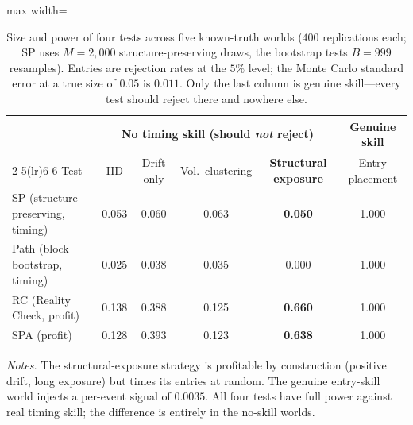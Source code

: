 \begin{table}[H]
\centering
\caption{Size and power of four tests across five known-truth worlds ($400$ replications each; SP uses $M=2{,}000$ structure-preserving draws, the bootstrap tests $B=999$ resamples). Entries are rejection rates at the $5\%$ level; the Monte Carlo standard error at a true size of $0.05$ is $0.011$. Only the last column is genuine skill---every test should reject there and nowhere else.}
\label{tab:competitor}
{\small
\renewcommand{\arraystretch}{1.15}
\begin{adjustbox}{max width=\textwidth}
\begin{tabular}{@{}lccccc@{}}
\toprule
& \multicolumn{4}{c}{No timing skill (should \emph{not} reject)} & Genuine skill \\
\cmidrule(lr){2-5}\cmidrule(lr){6-6}
Test & IID & Drift only & Vol.\ clustering & \textbf{Structural exposure} & Entry placement \\
\midrule
SP (structure-preserving, timing) & 0.053 & 0.060 & 0.063 & \textbf{0.050} & 1.000 \\
Path (block bootstrap, timing)    & 0.025 & 0.038 & 0.035 & 0.000 & 1.000 \\
RC (Reality Check, profit)        & 0.138 & 0.388 & 0.125 & \textbf{0.660} & 1.000 \\
SPA (profit)                      & 0.128 & 0.393 & 0.123 & \textbf{0.638} & 1.000 \\
\bottomrule
\end{tabular}
\end{adjustbox}
}
\par\vspace{0.5em}
\begin{minipage}{0.95\textwidth}
\centering
\footnotesize\emph{Notes.} The structural-exposure strategy is profitable by construction (positive drift, long exposure) but times its entries at random. The genuine entry-skill world injects a per-event signal of $0.0035$. All four tests have full power against real timing skill; the difference is entirely in the no-skill worlds.
\end{minipage}
\end{table}

